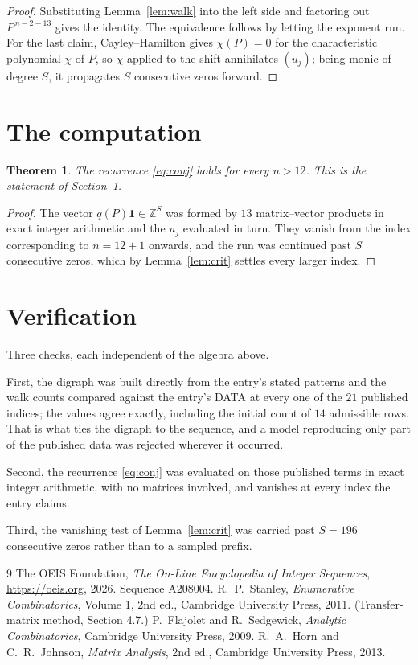 \documentclass[11pt,a4paper]{article}
\theoremstyle{plain}
\newtheorem{theorem}{Theorem}
\theoremstyle{definition}
\begin{document}
\begin{proof}
Substituting Lemma~\ref{lem:walk} into the left side and factoring out
$P^{\,n-2-13}$ gives the identity. The equivalence follows by letting the exponent
run. For the last claim, Cayley--Hamilton gives $\chi(P)=0$ for the characteristic
polynomial $\chi$ of $P$, so $\chi$ applied to the shift annihilates $(u_j)$; being monic of
degree $S$, it propagates $S$ consecutive zeros forward.
\end{proof}

\section{The computation}

\begin{theorem}
The recurrence \eqref{eq:conj} holds for every $n>12$. This is the statement of
Section~1.
\end{theorem}

\begin{proof}
The vector $q(P)\mathbf{1}\in\mathbb{Z}^{S}$ was formed by $13$ matrix--vector
products in exact integer arithmetic and the $u_j$ evaluated in turn. They vanish from the
index corresponding to $n=12+1$ onwards, and the run was continued past $S$ consecutive
zeros, which by Lemma~\ref{lem:crit} settles every larger index.
\end{proof}

\section{Verification}

Three checks, each independent of the algebra above.

First, the digraph was built directly from the entry's stated patterns and the walk counts
compared against the entry's DATA at every one of the $21$ published indices; the
values agree exactly, including the initial count of $14$ admissible rows. That is
what ties the digraph to the sequence, and a model reproducing only part of the published
data was rejected wherever it occurred.

Second, the recurrence \eqref{eq:conj} was evaluated on those published terms in exact
integer arithmetic, with no matrices involved, and vanishes at every index the entry claims.

Third, the vanishing test of Lemma~\ref{lem:crit} was carried past $S=196$ consecutive
zeros rather than to a sampled prefix.

\begin{thebibliography}{9}
 The OEIS Foundation, \emph{The On-Line Encyclopedia of Integer
Sequences}, \url{https://oeis.org}, 2026. Sequence A208004.
 R.~P.~Stanley, \emph{Enumerative Combinatorics}, Volume 1, 2nd ed.,
Cambridge University Press, 2011. (Transfer-matrix method, Section 4.7.)
 P.~Flajolet and R.~Sedgewick, \emph{Analytic Combinatorics}, Cambridge
University Press, 2009.
 R.~A.~Horn and C.~R.~Johnson, \emph{Matrix Analysis}, 2nd ed., Cambridge
University Press, 2013.
\end{thebibliography}
\end{document}
